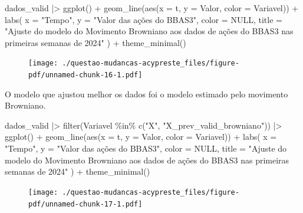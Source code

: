 \documentclass[
  letterpaper,
  DIV=11,
  numbers=noendperiod]{scrreprt}
\newenvironment{Shaded}{\begin{snugshade}}{\end{snugshade}}
\newcommand{\AttributeTok}[1]{\textcolor[rgb]{0.40,0.45,0.13}{#1}}
\newcommand{\ConstantTok}[1]{\textcolor[rgb]{0.56,0.35,0.01}{#1}}
\newcommand{\FunctionTok}[1]{\textcolor[rgb]{0.28,0.35,0.67}{#1}}
\newcommand{\NormalTok}[1]{\textcolor[rgb]{0.00,0.23,0.31}{#1}}
\newcommand{\SpecialCharTok}[1]{\textcolor[rgb]{0.37,0.37,0.37}{#1}}
\newcommand{\StringTok}[1]{\textcolor[rgb]{0.13,0.47,0.30}{#1}}
\begin{document}
\begin{Shaded}
\begin{Highlighting}[]
\NormalTok{dados\_valid }\SpecialCharTok{|\textgreater{}}
    \FunctionTok{ggplot}\NormalTok{() }\SpecialCharTok{+}
    \FunctionTok{geom\_line}\NormalTok{(}\FunctionTok{aes}\NormalTok{(}\AttributeTok{x =}\NormalTok{ t, }\AttributeTok{y =}\NormalTok{ Valor, }\AttributeTok{color =}\NormalTok{ Variavel)) }\SpecialCharTok{+}
    \FunctionTok{labs}\NormalTok{(}
        \AttributeTok{x =} \StringTok{"Tempo"}\NormalTok{,}
        \AttributeTok{y =} \StringTok{"Valor das ações do BBAS3"}\NormalTok{,}
        \AttributeTok{color =} \ConstantTok{NULL}\NormalTok{,}
        \AttributeTok{title =} \StringTok{"Ajuste do modelo do Movimento Browniano aos dados}
\StringTok{          de ações do BBAS3 nas primeiras semanas de 2024"}
\NormalTok{    ) }\SpecialCharTok{+}
    \FunctionTok{theme\_minimal}\NormalTok{()}
\end{Highlighting}
\end{Shaded}

\begin{figure}[H]

{\centering \texttt{[image: ./questao-mudancas-acypreste\_files/figure-pdf/unnamed-chunk-16-1.pdf]}

}

\end{figure}

O modelo que ajustou melhor os dados foi o modelo estimado pelo
movimento Browniano.

\begin{Shaded}
\begin{Highlighting}[]
\NormalTok{dados\_valid }\SpecialCharTok{|\textgreater{}}
    \FunctionTok{filter}\NormalTok{(Variavel }\SpecialCharTok{\%in\%} \FunctionTok{c}\NormalTok{(}\StringTok{"X"}\NormalTok{, }\StringTok{"X\_prev\_valid\_browniano"}\NormalTok{)) }\SpecialCharTok{|\textgreater{}}
    \FunctionTok{ggplot}\NormalTok{() }\SpecialCharTok{+}
    \FunctionTok{geom\_line}\NormalTok{(}\FunctionTok{aes}\NormalTok{(}\AttributeTok{x =}\NormalTok{ t, }\AttributeTok{y =}\NormalTok{ Valor, }\AttributeTok{color =}\NormalTok{ Variavel)) }\SpecialCharTok{+}
    \FunctionTok{labs}\NormalTok{(}
        \AttributeTok{x =} \StringTok{"Tempo"}\NormalTok{,}
        \AttributeTok{y =} \StringTok{"Valor das ações do BBAS3"}\NormalTok{,}
        \AttributeTok{color =} \ConstantTok{NULL}\NormalTok{,}
        \AttributeTok{title =} \StringTok{"Ajuste do modelo do Movimento Browniano aos dados}
\StringTok{          de ações do BBAS3 nas primeiras semanas de 2024"}
\NormalTok{    ) }\SpecialCharTok{+}
    \FunctionTok{theme\_minimal}\NormalTok{()}
\end{Highlighting}
\end{Shaded}

\begin{figure}[H]

{\centering \texttt{[image: ./questao-mudancas-acypreste\_files/figure-pdf/unnamed-chunk-17-1.pdf]}

}

\end{figure}



\printindex
\end{document}
